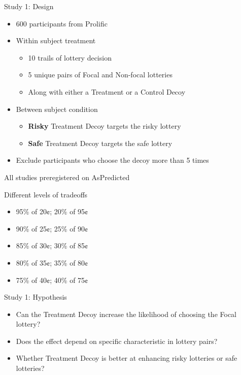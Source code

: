 \documentclass[
  ignorenonframetext,
  aspectratio=169]{beamer}
\begin{document}
\begin{frame}{Study 1: Design}
\label{study-1-design}
\begin{itemize}
  \item 600 participants from Prolific
  \pause
  \item Within subject treatment
  \begin{itemize}
    \pause
    \item 10 trails of lottery decision
    \item 5 unique pairs of Focal and Non-focal lotteries
    \item Along with either a Treatment or a Control Decoy
  \end{itemize}
  \pause
  \item Between subject condition
  \begin{itemize}
    \pause
    \item \textbf{Risky} Treatment Decoy targets the risky lottery
    \item \textbf{Safe} Treatment Decoy targets the safe lottery
  \end{itemize}
  \pause
  \item Exclude participants who choose the decoy more than 5 times
\end{itemize}

\vfill

\hfill \tiny *All studies preregistered on AsPredicted
\end{frame}

\begin{frame}{Different levels of tradeoffs}
\label{different-levels-of-tradeoffs}
\begin{itemize}
  \item 95\% of 20¢; 20\% of 95¢
  \item 90\% of 25¢; 25\% of 90¢
  \item 85\% of 30¢; 30\% of 85¢
  \item 80\% of 35¢; 35\% of 80¢
  \item 75\% of 40¢; 40\% of 75¢
\end{itemize}
\end{frame}

\begin{frame}{Study 1: Hypothesis}
\label{study-1-hypothesis}
\begin{itemize}
  \item Can the Treatment Decoy increase the likelihood of choosing the Focal lottery?
  \pause
  \item Does the effect depend on specific characteristic in lottery pairs?
  \pause
  \item Whether Treatment Decoy is better at enhancing risky lotteries or safe lotteries?
\end{itemize}
\end{frame}
\end{document}
